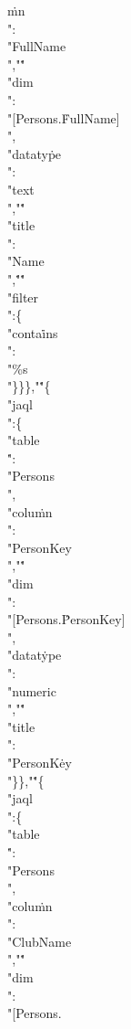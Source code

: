 \.{mn\\":\\"FullName\\","}\.{"\\"dim\\":\\"[Persons.}\)\.{FullName]\\",%
\\"dataty}\)\.{pe\\":\\"text\\","}\.{"\\"title\\":\\"Name\\",}\)\.{"}\.{"%
\\"filter\\":\{\\"conta}\)\.{ins\\":\\"\%s\\"\}\}\},"}\.{"\{\\"jaql\\":\{%
\\"table\\}\)\.{":\\"Persons\\",\\"colu}\)\.{mn\\":\\"PersonKey\\","}\.{"\\"dim%
\\":\\"[Persons.}\)\.{PersonKey]\\",\\"datat}\)\.{ype\\":\\"numeric\\","}\.{"%
\\"title\\":\\"PersonK}\)\.{ey\\"\}\},"}\.{"\{\\"jaql\\":\{\\"table\\}\)\.{":%
\\"Persons\\",\\"colu}\)\.{mn\\":\\"ClubName\\","}\.{"\\"dim\\":\\"[Persons.}\)%
